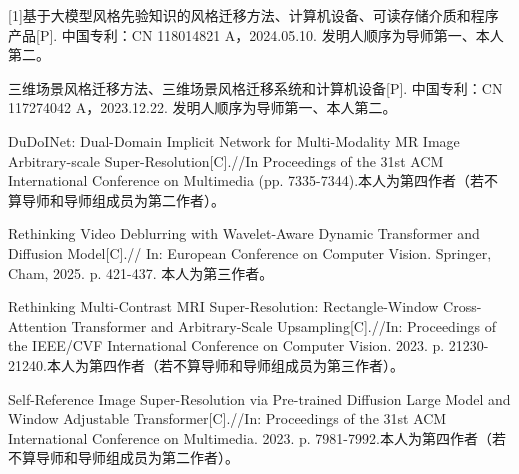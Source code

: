 \cleardoublepage
{}
[1]基于大模型风格先验知识的风格迁移方法、计算机设备、可读存储介质和程序产品[P]. 中国专利：CN 118014821 A，2024.05.10. 发明人顺序为导师第一、本人第二。
\par [2]三维场景风格迁移方法、三维场景风格迁移系统和计算机设备[P]. 中国专利：CN 117274042 A，2023.12.22. 发明人顺序为导师第一、本人第二。
\par [3]DuDoINet: Dual-Domain Implicit Network for Multi-Modality MR Image Arbitrary-scale Super-Resolution[C].//In Proceedings of the 31st ACM International Conference on Multimedia (pp. 7335-7344).本人为第四作者（若不算导师和导师组成员为第二作者）。
\par [4]Rethinking Video Deblurring with Wavelet-Aware Dynamic Transformer and Diffusion Model[C].// In: European Conference on Computer Vision. Springer, Cham, 2025. p. 421-437. 本人为第三作者。
\par [5]Rethinking Multi-Contrast MRI Super-Resolution: Rectangle-Window Cross-Attention Transformer and Arbitrary-Scale Upsampling[C].//In: Proceedings of the IEEE/CVF International Conference on Computer Vision. 2023. p. 21230-21240.本人为第四作者（若不算导师和导师组成员为第三作者）。
\par [6]Self-Reference Image Super-Resolution via Pre-trained Diffusion Large Model and Window Adjustable Transformer[C].//In: Proceedings of the 31st ACM International Conference on Multimedia. 2023. p. 7981-7992.本人为第四作者（若不算导师和导师组成员为第二作者）。
